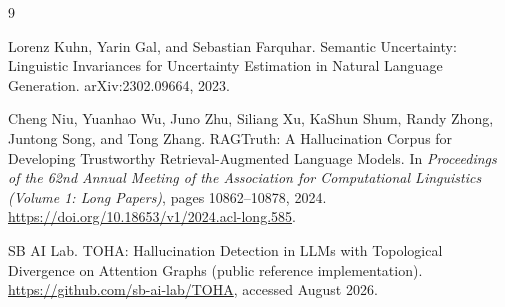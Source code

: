 \documentclass[11pt,a4paper]{article}
\begin{document}
\clearpage
\begin{thebibliography}{9}

Lorenz Kuhn, Yarin Gal, and Sebastian Farquhar.
\newblock Semantic Uncertainty: Linguistic Invariances for Uncertainty Estimation in Natural Language Generation.
\newblock arXiv:2302.09664, 2023.

Cheng Niu, Yuanhao Wu, Juno Zhu, Siliang Xu, KaShun Shum, Randy Zhong, Juntong Song, and Tong Zhang.
\newblock RAGTruth: A Hallucination Corpus for Developing Trustworthy Retrieval-Augmented Language Models.
\newblock In \emph{Proceedings of the 62nd Annual Meeting of the Association for Computational Linguistics (Volume 1: Long Papers)}, pages 10862--10878, 2024.
\newblock \url{https://doi.org/10.18653/v1/2024.acl-long.585}.

SB AI Lab.
\newblock TOHA: Hallucination Detection in LLMs with Topological Divergence on Attention Graphs (public reference implementation).
\newblock \url{https://github.com/sb-ai-lab/TOHA}, accessed August 2026.

\end{thebibliography}
\end{document}
